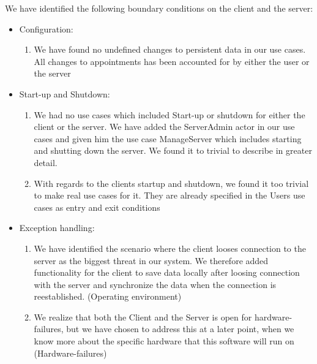 We have identified the following boundary conditions on the client and the server:


\begin{itemize}
	\item Configuration:
	\begin{enumerate}
		\item We have found no undefined changes to persistent data in our use cases. All changes to appointments has been accounted for by either the user or the server
	\end{enumerate}
	\item Start-up and Shutdown:
	\begin{enumerate}
		\item We had no use cases which included Start-up or shutdown for either the client or the server. We have added the ServerAdmin actor in our use cases and given him the use case ManageServer which includes starting and shutting down the server. We found it to trivial to describe in greater detail.
		\item With regards to the clients startup and shutdown, we found it too trivial to make real use cases for it. They are already specified in the Users use cases as entry and exit conditions
	\end{enumerate}
	\item Exception handling:
	\begin{enumerate}
		\item We have identified the scenario where the client looses connection to the server as the biggest threat in our system. We therefore added functionality for the client to save data locally after loosing connection with the server and synchronize the data when the connection is reestablished. (Operating environment)
		\item We realize that both the Client and the Server is open for hardware-failures, but we have chosen to address this at a later point, when we know more about the specific hardware that this software will run on (Hardware-failures)
	\end{enumerate}
\end{itemize}